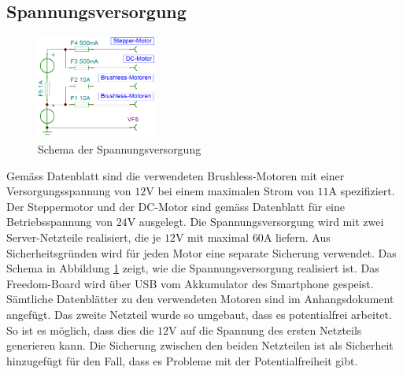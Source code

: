     \subsection{Spannungsversorgung}       
        \begin{figure}
           	\includegraphics[width=0.35\textwidth,clip,trim=0mm 0.5mm 0mm 0mm]
           	{Enddokumentation/Bilder/BeschaltungNetzteile.png}
           	\centering
           	\caption{Schema der Spannungsversorgung} 
           	\label{abb:Spannungsversorgung}
        \end{figure}
        Gemäss Datenblatt sind die verwendeten Brushless-Motoren mit einer Versorgungsspannung 
        von $12\si{\volt}$ bei einem maximalen Strom von $11\si{\ampere}$ spezifiziert. 
        Der Steppermotor und der DC-Motor sind gemäss Datenblatt für eine Betriebsspannung 
        von $24\si{\volt}$ ausgelegt. Die Spannungsversorgung wird mit zwei Server-Netzteile 
        realisiert, die je $12\si{\volt}$ mit maximal $60\si{\ampere}$ liefern. Aus 
        Sicherheitsgründen wird für jeden Motor eine separate Sicherung verwendet. Das Schema 
        in Abbildung \ref{abb:Spannungsversorgung} zeigt, wie die Spannungsversorgung 
        realisiert ist. Das Freedom-Board wird über USB vom Akkumulator des Smartphone 
        gespeist. Sämtliche Datenblätter zu den verwendeten Motoren sind im Anhangsdokument 
        angefügt. Das zweite Netzteil wurde so umgebaut, dass es potentialfrei arbeitet. So 
        ist es möglich, dass dies die $12\si{\volt}$ auf die Spannung des ersten Netzteils 
        generieren kann. Die Sicherung zwischen den beiden Netzteilen ist als Sicherheit 
        hinzugefügt für den Fall, dass es Probleme mit der Potentialfreiheit gibt.	